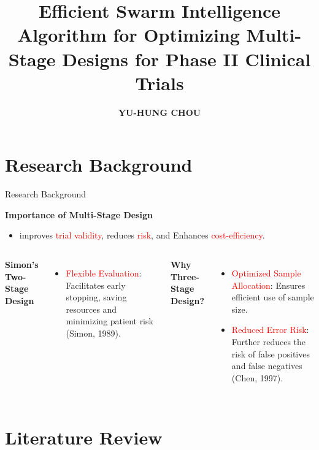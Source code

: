 \documentclass[xcolor=red]{beamer}
\title{Efficient Swarm Intelligence Algorithm for Optimizing Multi-Stage Designs for Phase II Clinical Trials}
\author{\textbf{YU-HUNG CHOU}}
\institute[National Taipei University] %
{
  National Taipei University \\ %
  \vspace{0.5cm}
  Advisor: Professor [Ping Yang Chen]  %
}
\date{}
\begin{document}
\maketitle


\section{Research Background}

\begin{frame}{Research Background}

\begin{center}
\vspace{0cm}
\textbf{Importance of Multi-Stage Design}
\begin{itemize}
    \item improves \textcolor{red}{trial validity}, reduces \textcolor{red}{risk}, and Enhances \textcolor{red}{cost-efficiency}.
\end{itemize}
\end{center}

\vspace{0.6cm} %

\begin{columns}
\textbf{Simon's Two-Stage Design}
\begin{itemize}
    \setlength{\itemsep}{0pt}
    \item \textcolor{red}{Flexible Evaluation}: Facilitates early stopping, saving resources and minimizing patient risk (Simon, 1989).
\end{itemize}

\vspace{0.5cm} %

\textbf{Why Three-Stage Design?}
\begin{itemize}
    \setlength{\itemsep}{0pt}
    \item \textcolor{red}{Optimized Sample Allocation}: Ensures efficient use of sample size.
    \item \textcolor{red}{Reduced Error Risk}: Further reduces the risk of false positives and false negatives (Chen, 1997).
\end{itemize}
\end{columns}
\end{frame}


\section{Literature Review}
\end{document}
